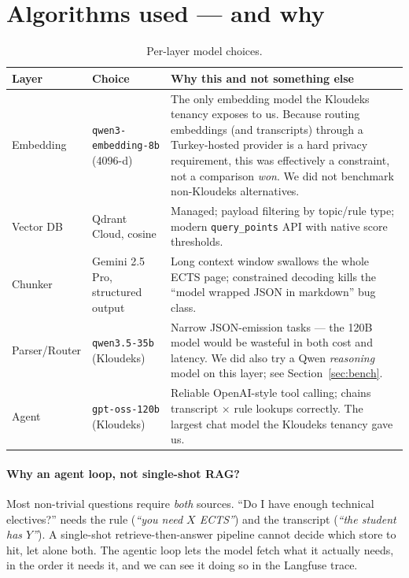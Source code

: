 \documentclass[11pt,a4paper]{article}
\begin{document}
\section{Algorithms used --- and why}

\begin{table}[h!]
\centering
\small
\begin{tabular}{@{}llp{8.5cm}@{}}
\toprule
\textbf{Layer} & \textbf{Choice} & \textbf{Why this and not something else} \\
\midrule
Embedding   & \texttt{qwen3-embedding-8b} (4096-d) & The only embedding model the
              Kloudeks tenancy exposes to us. Because routing embeddings (and
              transcripts) through a Turkey-hosted provider is a hard privacy
              requirement, this was effectively a constraint, not a comparison
              \emph{won}. We did not benchmark non-Kloudeks alternatives. \\
Vector DB   & Qdrant Cloud, cosine & Managed; payload filtering by topic/rule
              type; modern \texttt{query\_points} API with native score
              thresholds. \\
Chunker     & Gemini 2.5 Pro, structured output & Long context window swallows
              the whole ECTS page; constrained decoding kills the
              ``model wrapped JSON in markdown'' bug class. \\
Parser/Router & \texttt{qwen3.5-35b} (Kloudeks) & Narrow JSON-emission tasks ---
              the 120B model would be wasteful in both cost and latency. We did
              also try a Qwen \emph{reasoning} model on this layer; see
              Section~\ref{sec:bench}. \\
Agent       & \texttt{gpt-oss-120b} (Kloudeks) & Reliable OpenAI-style tool
              calling; chains transcript $\times$ rule lookups correctly. The
              largest chat model the Kloudeks tenancy gave us. \\
\bottomrule
\end{tabular}
\caption{Per-layer model choices.}
\end{table}

\paragraph{Why an agent loop, not single-shot RAG?} Most non-trivial questions
require \emph{both} sources. ``Do I have enough technical electives?'' needs
the rule (\emph{``you need $X$ ECTS''}) and the transcript (\emph{``the student
has $Y$''}). A single-shot retrieve-then-answer pipeline cannot decide which
store to hit, let alone both. The agentic loop lets the model fetch what it
actually needs, in the order it needs it, and we can see it doing so in the
Langfuse trace.
\end{document}
